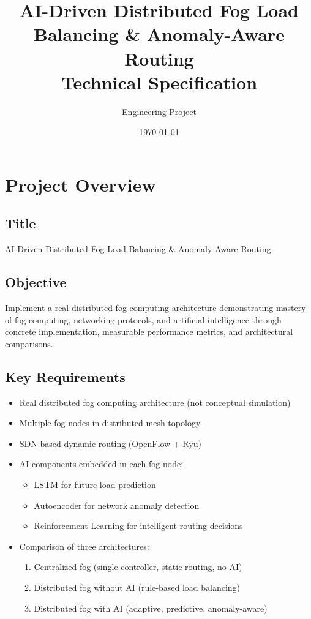 \documentclass[11pt,a4paper]{article}
\title{AI-Driven Distributed Fog Load Balancing \& Anomaly-Aware Routing\\
Technical Specification}
\author{Engineering Project}
\date{\today}
\begin{document}
\maketitle

\section{Project Overview}

\subsection{Title}
AI-Driven Distributed Fog Load Balancing \& Anomaly-Aware Routing

\subsection{Objective}
Implement a real distributed fog computing architecture demonstrating mastery of fog computing, networking protocols, and artificial intelligence through concrete implementation, measurable performance metrics, and architectural comparisons.

\subsection{Key Requirements}
\begin{itemize}
    \item Real distributed fog computing architecture (not conceptual simulation)
    \item Multiple fog nodes in distributed mesh topology
    \item SDN-based dynamic routing (OpenFlow + Ryu)
    \item AI components embedded in each fog node:
    \begin{itemize}
        \item LSTM for future load prediction
        \item Autoencoder for network anomaly detection
        \item Reinforcement Learning for intelligent routing decisions
    \end{itemize}
    \item Comparison of three architectures:
    \begin{enumerate}
        \item Centralized fog (single controller, static routing, no AI)
        \item Distributed fog without AI (rule-based load balancing)
        \item Distributed fog with AI (adaptive, predictive, anomaly-aware)
    \end{enumerate}
\end{itemize}
\end{document}
